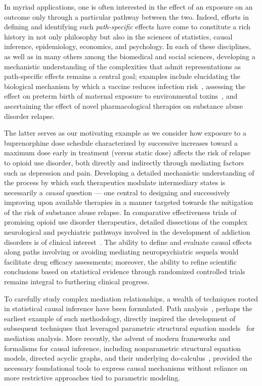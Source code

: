In myriad applications, one is often interested in the effect of an exposure on
an outcome only through a particular pathway between the two. Indeed, efforts in
defining and identifying such \textit{path-specific} effects have come to
constitute a rich history in not only philosophy but also in the sciences of
statistics, causal inference, epidemiology, economics, and psychology. In each
of these disciplines, as well as in many others among the biomedical and social
sciences, developing a mechanistic understanding of the complexities that admit
representations as path-specific effects remains a central goal; examples
include elucidating the biological mechanism by which a vaccine reduces
infection risk~\citep[e.g.,][]{corey2015immune, hejazi2020efficient}, assessing
the effect on preterm birth of maternal exposure to environmental
toxins~\citep[e.g.,][]{ferguson2017mediation}, and ascertaining the effect of
novel pharmacological therapies on substance abuse disorder relapse.

The latter serves as our motivating example as we consider how exposure to
a buprenorphine dose schedule characterized by successive increases toward
a maximum dose early in treatment (versus static dose) affects the risk of
relapse to opioid use disorder, both directly and indirectly through mediating
factors such as depression and pain. Developing a detailed mechanistic
understanding of the process by which such therapeutics modulate intermediary
states is necessarily a \textit{causal} question --- one central to designing
and successively improving upon available therapies in a manner targeted towards
the mitigation of the risk of substance abuse relapse. In comparative
effectiveness trials of promising opioid use disorder therapeutics, detailed
dissections of the complex neurological and psychiatric pathways involved in the
development of addiction disorders is of clinical
interest~\citep{lee2018comparative, rudolph2020explaining}. The ability to
define and evaluate causal effects along paths involving or avoiding mediating
neuropsychiatric sequela would facilitate drug efficacy assessments; moreover,
the ability to  refine scientific conclusions based on statistical evidence
through randomized controlled trials remains integral to furthering clinical
progress.

To carefully study complex mediation relationships, a wealth of techniques
rooted in statistical causal inference have been formulated. Path
analysis~\citep{wright1921correlation, wright1934method}, perhaps the earliest
example of such methodology, directly inspired the development of subsequent
techniques that leveraged parametric structural equation
models~\citep[e.g.,][]{goldberger1972structural, baron1986moderator} for
mediation analysis. More
recently, the advent of modern frameworks and formalisms for causal inference,
including nonparametric structural equation models, directed acyclic graphs,
and their underlying do-calculus~\citep{pearl1995causal, pearl2000causality},
provided the necessary foundational tools to express causal mechanisms without
reliance on more restrictive approaches tied to parametric modeling.

